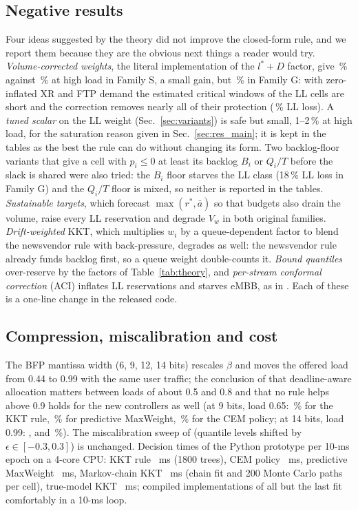\documentclass[journal]{IEEEtran}
\newcommand{\rstar}{r^{\ast}}
\begin{document}
\subsection{Negative results}
\label{sec:negative}
Four ideas suggested by the theory did not improve the closed-form rule, and we report them because they are the obvious next things a reader would try. \emph{Volume-corrected weights}, the literal implementation of the $l^\ast + D$ factor, give \xmeanhighproposedvc{}\,\% against \xmeanhighproposed{}\,\% at high load in Family S, a small gain, but \xmeantgpphighproposedvc{}\,\% in Family G: with zero-inflated XR and FTP demand the estimated critical windows of the LL cells are short and the correction removes nearly all of their protection (\xmeantgpphighproposedvcLL{}\,\% LL loss). A \emph{tuned scalar} on the LL weight (Sec.~\ref{sec:variants}) is safe but small, 1--2\,\% at high load, for the saturation reason given in Sec.~\ref{sec:res_main}; it is kept in the tables as the best the rule can do without changing its form. Two backlog-floor variants that give a cell with $p_i \le 0$ at least its backlog $B_i$ or $Q_i/T$ before the slack is shared were also tried: the $B_i$ floor starves the LL class (18\,\% LL loss in Family G) and the $Q_i/T$ floor is mixed, so neither is reported in the tables. \emph{Sustainable targets}, which forecast $\max(\rstar, \bar a)$ so that budgets also drain the volume, raise every LL reservation and degrade $V_w$ in both original families. \emph{Drift-weighted} KKT, which multiplies $w_i$ by a queue-dependent factor to blend the newsvendor rule with back-pressure, degrades as well: the newsvendor rule already funds backlog first, so a queue weight double-counts it. \emph{Bound quantiles} over-reserve by the factors of Table~\ref{tab:theory}, and \emph{per-stream conformal correction} (ACI) inflates LL reservations and starves eMBB, as in \cite{ncc2027}. Each of these is a one-line change in the released code.

\subsection{Compression, miscalibration and cost}
The BFP mantissa width (6, 9, 12, 14 bits) rescales $\beta$ and moves the offered load from 0.44 to 0.99 with the same user traffic; the conclusion of \cite{ncc2027} that deadline-aware allocation matters between loads of about 0.5 and 0.8 and that no rule helps above 0.9 holds for the new controllers as well (at 9 bits, load 0.65: \xcompBnineproposed{}\,\% for the KKT rule, \xcompBninepredmaxweight{}\,\% for predictive MaxWeight, \xcompBninecempolicy{}\,\% for the CEM policy; at 14 bits, load 0.99: \xcompBonefourproposed{}, \xcompBonefourpredmaxweight{} and \xcompBonefourcempolicy{}\,\%). The miscalibration sweep of \cite{ncc2027} (quantile levels shifted by $\epsilon \in [-0.3, 0.3]$) is unchanged. Decision times of the Python prototype per 10-ms epoch on a 4-core CPU: KKT rule \xdtproposed{}~ms (1800 trees), CEM policy \xdtcempolicy{}~ms, predictive MaxWeight \xdtpredmaxweight{}~ms, Markov-chain KKT \xdtmarkovkkt{}~ms (chain fit and 200 Monte Carlo paths per cell), true-model KKT \xdtmarkovoraclekkt{}~ms; compiled implementations of all but the last fit comfortably in a 10-ms loop.
\end{document}
